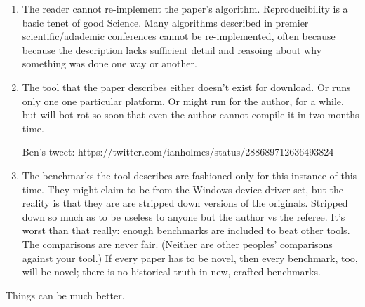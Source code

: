 \documentclass[conference]{IEEEtran}
\begin{document}
\begin{enumerate}

\item The reader cannot re-implement the paper's
  algorithm. Reproducibility is a basic tenet of good Science. Many
  algorithms described in premier scientific/adademic conferences
  cannot be re-implemented, often because because the description
  lacks sufficient detail and reasoing about why something was done
  one way or another.

\item The tool that the paper describes either doesn't exist for
  download. Or runs only one one particular platform. Or might run for
  the author, for a while, but will bot-rot so soon that even the
  author cannot compile it in two months time.

  Ben's tweet: https://twitter.com/ianholmes/status/288689712636493824

\item The benchmarks the tool describes are fashioned only for this
  instance of this time. They might claim to be from the Windows
  device driver set, but the reality is that they are are stripped
  down versions of the originals. Stripped down so much as to be
  useless to anyone but the author vs the referee. It's worst than
  that really: enough benchmarks are included to beat other tools. The
  comparisons are never fair. (Neither are other peoples' comparisons
  against your tool.) If every paper has to be novel, then every
  benchmark, too, will be novel; there is no historical truth in new,
  crafted benchmarks.
\end{enumerate}

Things can be much better. 
\end{document}
